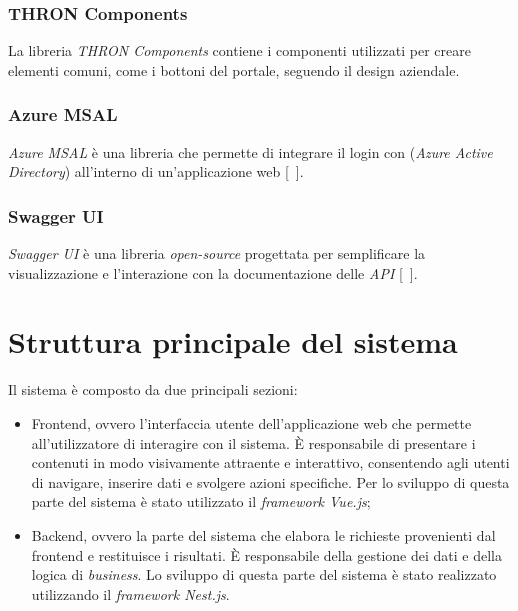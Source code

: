 \subsubsection{THRON Components}\label{subsubsec:thron-components}
La libreria \textit{THRON Components} contiene i componenti utilizzati per creare elementi comuni, come i bottoni del portale, seguendo il design aziendale.
\subsubsection{Azure MSAL}\label{subsubsec:azure-MSAL}
\textit{Azure MSAL} è una libreria che permette di integrare il login con  (\textit{Azure Active Directory}) all'interno di un'applicazione web [~\cite{site:msal}].
\subsubsection{Swagger UI}\label{subsubsec:swagger-ui}
\textit{Swagger UI} è una libreria \textit{open-source} progettata per semplificare la visualizzazione e l'interazione con la documentazione delle \textit{API} [~\cite{site:swagger}].

\section{Struttura principale del sistema}
Il sistema è composto da due principali sezioni:
\begin{itemize}
  \item Frontend, ovvero l'interfaccia utente dell'applicazione web che permette all'utilizzatore di interagire con il sistema. È responsabile di presentare i contenuti in modo visivamente attraente e interattivo, consentendo agli utenti di navigare, inserire dati e svolgere azioni specifiche. Per lo
  sviluppo di questa parte del sistema è stato utilizzato il \textit{framework Vue.js};
  \item Backend, ovvero la parte del sistema che elabora le richieste provenienti dal frontend e restituisce i risultati. È responsabile della gestione dei dati e della logica di \textit{business}.
  Lo sviluppo di questa parte del sistema è stato realizzato utilizzando il \textit{framework Nest.js}. 
\end{itemize}

